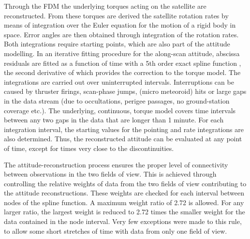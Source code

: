 \documentclass{aa}
\begin{document}
Through the FDM the underlying torques acting on the satellite are 
reconstructed. From these torques are derived the satellite rotation rates 
by means of integration over the Euler equation for the motion of a rigid body 
in space. Error angles are then obtained through integration of the 
rotation rates. Both integrations require starting points, which are also
part of the attitude modelling.
In an iterative fitting procedure for the along-scan attitude, abscissa 
residuals are fitted as a function of time with a 5th order exact spline 
function \citep{paper4, fvl07}, the second derivative of which provides the 
correction to the 
torque model. The integrations are carried out over uninterrupted intervals. 
Interruptions can be caused by thruster firings, scan-phase jumps, 
(micro meteoroid) hits or 
large gaps in the data stream (due to occultations, perigee passages, 
no ground-station coverage etc.). The underlying, continuous, torque model 
covers time intervals between any two gaps in the data that are longer than 
1 minute. For each integration interval, the starting values for the pointing 
and rate integrations are also determined. Thus, the reconstructed attitude 
can be evaluated at any point of time, except for times very close to the 
discontinuities.

The attitude-reconstruction process ensures the proper level of connectivity 
between observations in the two fields of view. This is achieved through
controlling the relative weights of data from the two fields of view 
contributing to the attitude reconstructions. These weights are checked 
for each interval between nodes of the spline function. A maximum
weight ratio of 2.72 is allowed. For any larger ratio, the largest weight
is reduced to 2.72 times the smaller weight for the data contained in
the node interval. Very few exceptions were made to this rule, to allow some
short stretches of time with data from only one field of view.
\end{document}
